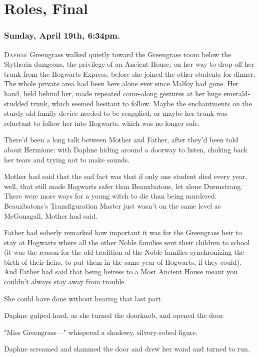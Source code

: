 \chapter{Roles, Final}

\label{ch-RolesFinal}

\subsection{Sunday, April 19th, 6:34pm.}

\lettrine{D}{aphne} Greengrass walked quietly toward the Greengrass room below the Slytherin
dungeons, the privilege of an Ancient House; on her way to drop off her trunk
from the Hogwarts Express, before she joined the other students for dinner. The
whole private area had been hers alone ever since Malfoy had gone. Her hand,
held behind her, made repeated come-along gestures at her huge emerald-studded
trunk, which seemed hesitant to follow. Maybe the enchantments on the sturdy
old family device needed to be reapplied; or maybe her trunk was reluctant to
follow her into Hogwarts, which was no longer safe.

There'd been a long talk between Mother and Father, after they'd been told
about Hermione; with Daphne hiding around a doorway to listen, choking back her
tears and trying not to make sounds.

Mother had said that the sad fact was that if only one student died every year,
well, that still made Hogwarts safer than Beauxbatons, let alone Durmstrang.
There were more ways for a young witch to die than being murdered.
Beauxbatons's Transfiguration Master just wasn't on the same level as
McGonagall, Mother had said.

Father had soberly remarked how important it was for the Greengrass heir to
stay at Hogwarts where all the other Noble families sent their children to
school (it was the reason for the old tradition of the Noble families
synchronizing the birth of their heirs, to put them in the same year of
Hogwarts, if they could). And Father had said that being heiress to a Most
Ancient House meant you couldn't always stay away from trouble.

She could have done without hearing that last part.

Daphne gulped hard, as she turned the doorknob, and opened the door.

"Miss Greengrass---" whispered a shadowy, silvery-robed figure.

Daphne screamed and slammed the door and drew her wand and turned to run.

